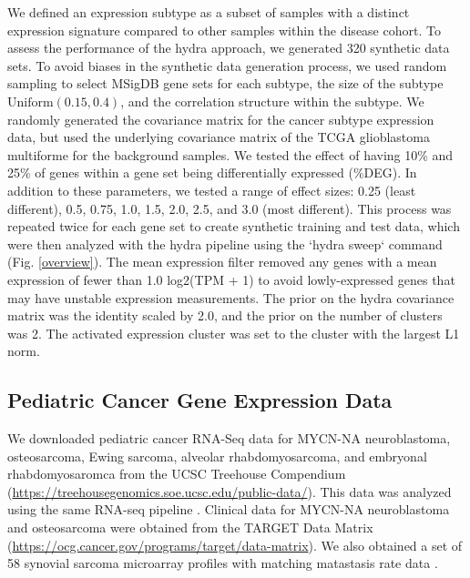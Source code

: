 \documentclass[10pt,letterpaper]{article}
\begin{document}
We defined an expression subtype as a subset of samples with a distinct expression signature compared to other samples within the disease cohort. To assess the performance of the hydra approach, we generated 320 synthetic data sets. To avoid biases in the synthetic data generation process, we used random sampling to select MSigDB gene sets for each subtype, the size of the subtype $\text{Uniform}(0.15, 0.4)$, and the correlation structure within the subtype. We randomly generated the covariance matrix for the cancer subtype expression data, but used the underlying covariance matrix of the TCGA glioblastoma multiforme for the background samples. We tested the effect of having 10\% and 25\% of genes within a gene set being differentially expressed (\%DEG). In addition to these parameters, we tested a range of effect sizes: 0.25 (least different), 0.5, 0.75, 1.0, 1.5, 2.0, 2.5, and 3.0 (most different). This process was repeated twice for each gene set to create synthetic training and test data, which were then analyzed with the hydra pipeline using the `hydra sweep` command (Fig. \ref{overview}). The mean expression filter removed any genes with a mean expression of fewer than 1.0 log2(TPM + 1) to avoid lowly-expressed genes that may have unstable expression measurements. The prior on the hydra covariance matrix was the identity scaled by 2.0, and the prior on the number of clusters was 2. The activated expression cluster was set to the cluster with the largest L1 norm.


\subsection{Pediatric Cancer Gene Expression Data}
We downloaded pediatric cancer RNA-Seq data for MYCN-NA neuroblastoma, osteosarcoma, Ewing sarcoma, alveolar rhabdomyosarcoma, and embryonal rhabdomyosaromca from the UCSC Treehouse Compendium (\url{https://treehousegenomics.soe.ucsc.edu/public-data/}). This data was analyzed using the same RNA-seq pipeline \cite{vivianToilEnablesReproducible2017}. Clinical data for MYCN-NA neuroblastoma and osteosarcoma were obtained from the TARGET Data Matrix (\url{https://ocg.cancer.gov/programs/target/data-matrix}). We also obtained a set of 58 synovial sarcoma microarray profiles with matching matastasis rate data \cite{lagardeChromosomeInstabilityAccounts2013}.
 
\end{document}
